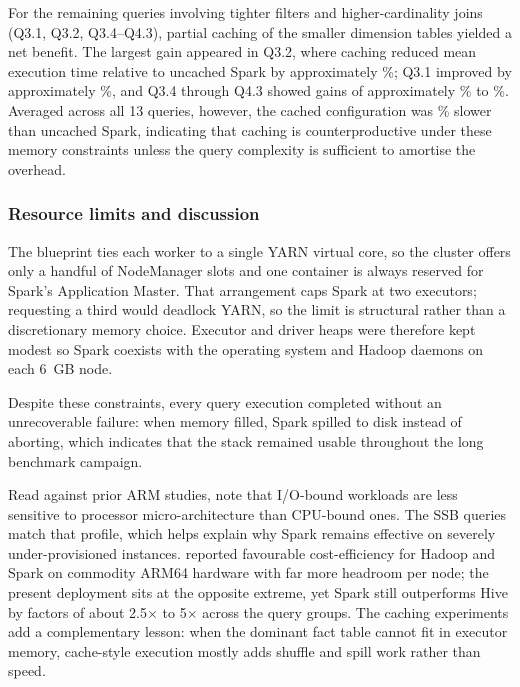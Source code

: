 For the remaining queries involving tighter filters and higher-cardinality
joins (Q3.1, Q3.2, Q3.4--Q4.3), partial caching of the smaller dimension tables
yielded a net benefit. The largest gain appeared in Q3.2, where caching reduced
mean execution time relative to uncached Spark by approximately \PaperQThreeTwoCacheImprovementPct\%;
Q3.1 improved by approximately \PaperExpQThreeOneCacheGainPct\%, and Q3.4 through Q4.3
showed gains of approximately \PaperExpCacheQThreeFourQFourThreeGainMinPct\% to \PaperExpCacheQThreeFourQFourThreeGainMaxPct\%. Averaged across all 13 queries,
however, the cached configuration was \PaperCacheVsSparkMeanPenaltyPct\% slower than uncached Spark,
indicating that caching is counterproductive under these memory constraints
unless the query complexity is sufficient to amortise the overhead.

\subsubsection{Resource limits and discussion}

The blueprint ties each worker to a single YARN virtual core, so the cluster
offers only a handful of NodeManager slots and one container is always reserved
for Spark's Application Master. That arrangement caps Spark at two executors;
requesting a third would deadlock YARN, so the limit is structural rather than a
discretionary memory choice. Executor and driver heaps were therefore kept
modest so Spark coexists with the operating system and Hadoop daemons on each
6~GB node.

Despite these constraints, every query execution completed without an
unrecoverable failure: when memory filled, Spark spilled to disk instead of
aborting, which indicates that the stack remained usable throughout the long
benchmark campaign.

Read against prior ARM studies, \citet{loghin2015performance} note that
I/O-bound workloads are less sensitive to processor micro-architecture than
CPU-bound ones. The SSB queries match that profile, which helps explain why Spark
remains effective on severely under-provisioned instances. \citet{8287751}
reported favourable cost-efficiency for Hadoop and Spark on commodity ARM64
hardware with far more headroom per node; the present deployment sits at the
opposite extreme, yet Spark still outperforms Hive by factors of about
2.5$\times$ to 5$\times$ across the query groups. The caching experiments add a
complementary lesson: when the dominant fact table cannot fit in executor memory, 
cache-style execution mostly adds shuffle and
spill work rather than speed.
